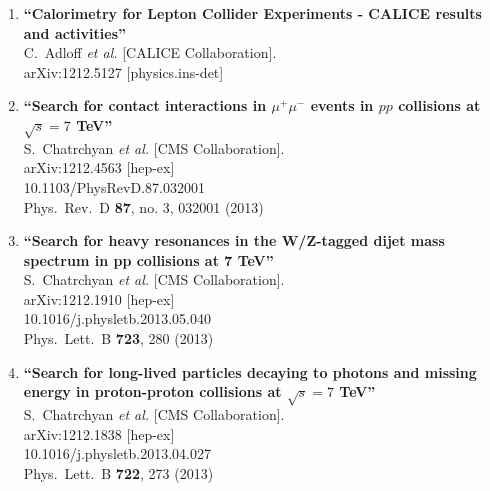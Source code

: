 \documentclass{article}
\begin{document}
\begin{enumerate}
\item%
{\bf ``Calorimetry for Lepton Collider Experiments - CALICE results and activities''}
  \\{}C.~Adloff {\it et al.}  [CALICE Collaboration].
  \\{}arXiv:1212.5127 [physics.ins-det]
  


\item%
{\bf ``Search for contact interactions in $\mu^+\mu^-$ events in $pp$ collisions at $\sqrt{s}=7$ TeV''}
  \\{}S.~Chatrchyan {\it et al.}  [CMS Collaboration].
  \\{}arXiv:1212.4563 [hep-ex]
    \\{}10.1103/PhysRevD.87.032001
\\{}Phys.\ Rev.\ D {\bf 87}, no. 3, 032001 (2013) %


\item%
{\bf ``Search for heavy resonances in the W/Z-tagged dijet mass spectrum in pp collisions at 7 TeV''}
  \\{}S.~Chatrchyan {\it et al.}  [CMS Collaboration].
  \\{}arXiv:1212.1910 [hep-ex]
    \\{}10.1016/j.physletb.2013.05.040
\\{}Phys.\ Lett.\ B {\bf 723}, 280 (2013) %


\item%
{\bf ``Search for long-lived particles decaying to photons and missing energy in proton-proton collisions at $\sqrt{s}=7$ TeV''}
  \\{}S.~Chatrchyan {\it et al.}  [CMS Collaboration].
  \\{}arXiv:1212.1838 [hep-ex]
    \\{}10.1016/j.physletb.2013.04.027
\\{}Phys.\ Lett.\ B {\bf 722}, 273 (2013) %



\end{enumerate}
\end{document}
